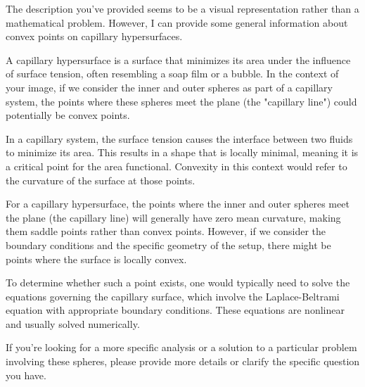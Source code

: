 The description you've provided seems to be a visual representation rather than a mathematical problem. However, I can provide some general information about convex points on capillary hypersurfaces.

A capillary hypersurface is a surface that minimizes its area under the influence of surface tension, often resembling a soap film or a bubble. In the context of your image, if we consider the inner and outer spheres as part of a capillary system, the points where these spheres meet the plane (the "capillary line") could potentially be convex points.

In a capillary system, the surface tension causes the interface between two fluids to minimize its area. This results in a shape that is locally minimal, meaning it is a critical point for the area functional. Convexity in this context would refer to the curvature of the surface at those points.

For a capillary hypersurface, the points where the inner and outer spheres meet the plane (the capillary line) will generally have zero mean curvature, making them saddle points rather than convex points. However, if we consider the boundary conditions and the specific geometry of the setup, there might be points where the surface is locally convex.

To determine whether such a point exists, one would typically need to solve the equations governing the capillary surface, which involve the Laplace-Beltrami equation with appropriate boundary conditions. These equations are nonlinear and usually solved numerically.

If you're looking for a more specific analysis or a solution to a particular problem involving these spheres, please provide more details or clarify the specific question you have.